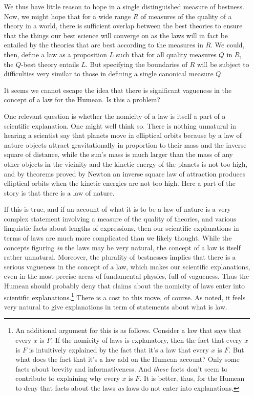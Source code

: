 We thus have little reason to hope in a single distinguished measure of bestness. Now, we might hope that for a wide range $R$ 
of measures of the quality of a theory in a world, there is sufficient overlap between the best theories to ensure that
the things our best science will converge on as the laws will in fact be entailed by the theories that are best according to the 
measures in $R$. We could, then, define a law as a proposition $L$ such that for all quality measures $Q$ in $R$, the $Q$-best theory
entails $L$. But specifying the boundaries of $R$ will be subject to difficulties very similar to those in defining a single canonical 
measure $Q$.

It seems we cannot escape the idea that there is significant vagueness in the concept of a law for the Humean.
Is this a problem?

One relevant question is whether the nomicity of a law is itself a part of a scientific explanation. One might well think so.
There is nothing unnatural in hearing a scientist say that planets move in elliptical orbits because
by a law of nature objects attract gravitationally in proportion to their mass and the inverse square of distance, while the
sun's mass is much larger than the mass of any other objects in the vicinity and the kinetic energy of the planets is not 
too high, and by theorems proved by Newton an inverse square law of attraction produces elliptical orbits when the kinetic
energies are not too high. Here a part of the story is that there is a law of nature.

If this is true, and if an account of what it is to be a law of nature is a very complex statement involving a measure
of the quality of theories, and various linguistic facts about lengths of expressions, then our scientific explanations in 
terms of laws are much more complicated than we likely thought. While the concepts figuring \textit{in} the laws may be very
natural, the concept of a law is itself rather unnatural. Moreover, the plurality of bestnesses implies that there is a serious
vagueness in the concept of a law, which makes our scientific explanations, even in the most precise areas of fundamental physics,
full of vagueness. Thus the Humean should probably deny that claims about the nomicity of laws enter into scientific 
explanations.\footnote{An additional argument for this is as follows. Consider a law that says that every $x$ is $F$. If the nomicity
of laws is explanatory, then the fact that every $x$ is $F$ is intuitively explained by the fact that it's a law that every $x$ is $F$.
But what does the fact that it's a law add on the Humean account? Only some facts about brevity and informativeness. And \textit{these}
facts don't seem to contribute to explaining why every $x$ is $F$. It is better, thus, for the Humean to deny that facts about the 
laws \textit{as} laws do not enter into explanations.} There is a cost to this move, of course. As noted, it feels very natural
to give explanations in term of statements about what is law. 

